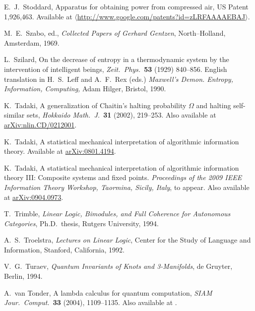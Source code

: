 \documentclass[12pt,twoside,openright]{report}
\begin{document}
\begin{thebibliography}{99}
 E.\ J.\ Stoddard, Apparatus for obtaining power from compressed air, US Patent 1,926,463.  Available at 
\hfill \break
\href{http://www.google.com/patents?id=zLRFAAAAEBAJ}
{$\langle$http://www.google.com/patents?id=zLRFAAAAEBAJ$\rangle$}.

 M.\ E.\ Szabo, ed., {\sl Collected Papers of Gerhard Gentzen}, North--Holland, Amsterdam, 1969.


 L.\ Szilard, On the decrease of entropy in a thermodynamic system by the intervention of intelligent beings,
\textsl{Zeit.\ Phys.\ }\textbf{53} (1929) 840--856. English translation in H.\ S.\ Leff and A.\ F.\ Rex (eds.)
\textit{Maxwell's Demon. Entropy, Information, Computing,} 
Adam Hilger, Bristol, 1990.

 K.\ Tadaki, A generalization of Chaitin's halting probability $\Omega$ and halting self-similar sets, {\sl Hokkaido Math.\ J.\ }\textbf{31} (2002), 219--253.  Also available at
\href{http://arxiv.org/abs/nlin.CD/0212001}{arXiv:nlin.CD/0212001}.

 K.\ Tadaki, A statistical mechanical interpretation of algorithmic information theory.  Available at
\href{http://arxiv.org/abs/0801.4194}{arXiv:0801.4194}.

 K.\ Tadaki, A statistical mechanical interpretation of algorithmic information theory III: Composite systems and fixed points.
\textsl{Proceedings of the 2009 IEEE Information Theory Workshop, Taormina, Sicily, Italy}, to appear.  Also available at
\href{http://arxiv.org/abs/0904.0973}{arXiv:0904.0973}.

 T.\ Trimble, {\sl Linear Logic, Bimodules, and Full Coherence for Autonomous Categories}, Ph.D.\ thesis, Rutgers University, 
1994. 

 A.\ S.\ Troelstra, {\sl Lectures on Linear Logic}, Center for the Study of Language and Information, Stanford, California,
1992.

 V.\ G.\ Turaev, {\sl Quantum Invariants of Knots and 3-Manifolds}, de Gruyter, Berlin, 1994.

 A.\ van Tonder, A lambda calculus for quantum computation,
{\sl SIAM Jour.\ Comput.\ }{\bf 33} (2004), 1109--1135. Also available at .


\end{thebibliography}
\end{document}
